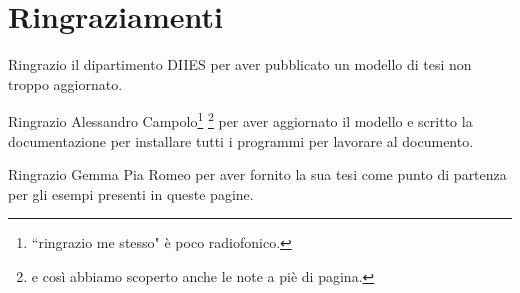 \documentclass[envcountsame,envcountchap]{svmono}
\begin{document}
\chapter*{Ringraziamenti}

Ringrazio il dipartimento DIIES per aver pubblicato un modello di tesi non troppo aggiornato.

Ringrazio Alessandro Campolo\footnote{``ringrazio me stesso" è poco radiofonico.} \footnote{e così abbiamo scoperto anche le note a piè di pagina.}
per aver aggiornato il modello e scritto la documentazione per installare tutti i programmi per lavorare al documento.

Ringrazio Gemma Pia Romeo per aver fornito la sua tesi come punto di partenza per gli esempi presenti in queste pagine.






\end{document}
